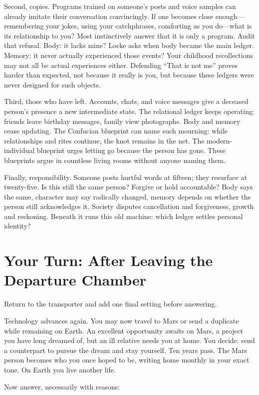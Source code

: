 Second, copies. Programs trained on someone's posts and voice samples can already imitate their conversation convincingly. If one becomes close enough---remembering your jokes, using your catchphrases, comforting as you do---what is its relationship to you? Most instinctively answer that it is only a program. Audit that refusal. Body: it lacks mine? Locke asks when body became the main ledger. Memory: it never actually experienced those events? Your childhood recollections may not all be actual experiences either. Defending ``That is not me'' proves harder than expected, not because it really is you, but because these ledgers were never designed for such objects.

Third, those who have left. Accounts, chats, and voice messages give a deceased person's presence a new intermediate state. The relational ledger keeps operating: friends leave birthday messages, family view photographs. Body and memory cease updating. The Confucian blueprint can name such mourning: while relationships and rites continue, the knot remains in the net. The modern-individual blueprint urges letting go because the person has gone. These blueprints argue in countless living rooms without anyone naming them.

Finally, responsibility. Someone posts hurtful words at fifteen; they resurface at twenty-five. Is this still the same person? Forgive or hold accountable? Body says the same, character may say radically changed, memory depends on whether the person still acknowledges it. Society disputes cancellation and forgiveness, growth and reckoning. Beneath it runs this old machine: which ledger settles personal identity?

\section[Your Turn: Leaving the Transporter]{Your Turn: After Leaving the Departure Chamber}
Return to the transporter and add one final setting before answering.

Technology advances again. You may now travel to Mars or send a duplicate while remaining on Earth. An excellent opportunity awaits on Mars, a project you have long dreamed of, but an ill relative needs you at home. You decide: send a counterpart to pursue the dream and stay yourself. Ten years pass. The Mars person becomes who you once hoped to be, writing home monthly in your exact tone. On Earth you live another life.

Now answer, necessarily with reasons:

